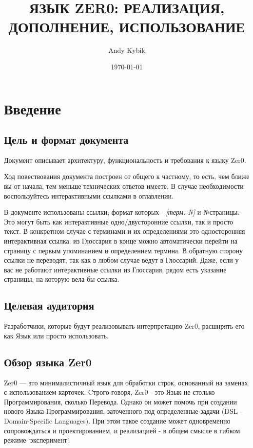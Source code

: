 \documentclass{book}
\title{ЯЗЫК ZER0: РЕАЛИЗАЦИЯ, ДОПОЛНЕНИЕ, ИСПОЛЬЗОВАНИЕ}
\author{Andy Kybik}
\date{\today}
\begin{document}
\maketitle

\tableofcontents

\chapter{Введение}
\section{Цель и формат документа}
Документ описывает архитектуру, функциональность и требования к языку Zer0. 

Ход повествования документа построен от общего к частному, то есть, чем ближе вы от начала, тем меньше технических ответов имеете. В случае необходимости воспользуйтесь интерактивными ссылками в оглавлении.

В документе использованы ссылки, формат которых - \textit{[терм. N]} и №страницы. Это могут быть как интерактивные одно/двусторонние ссылки, так и просто текст. В конкретном случае с терминами и их определениями это односторонняя интерактивная ссылка: из Глоссария в конце можно автоматически перейти на страницу с первым упоминанием и определением термина. В обратную сторону ссылки не переводят, так как в любом случае ведут в Глоссарий. Даже, если у вас не работают интерактивные ссылки из Глоссария, рядом есть указание страницы, на которую вела бы ссылка.

\section{Целевая аудитория}
Разработчики, которые будут реализовывать интерпретацию Zer0, расширять его как Язык или просто использовать.

\section{Обзор языка Zer0}
Zer0 — это минималистичный язык для обработки строк, основанный на заменах с использованием карточек. Cтрого говоря, Zer0 - это Язык не столько Программирования, сколько Перевода. Однако он может помочь при создании нового Языка Программирования, заточенного под определенные задачи (DSL - Domain-Specific Languages). При этом такое создание может одновременно сопровождаться и проектированием, и реализацией - в общем смысле в гибком режиме `эксперимент'.
\end{document}
